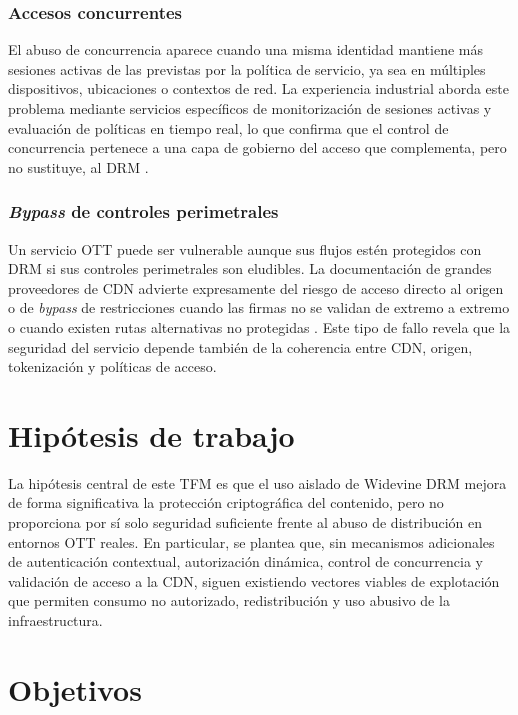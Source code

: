 \subsubsection{Accesos concurrentes}

El abuso de concurrencia aparece cuando una misma identidad mantiene más sesiones activas de las previstas por la política de servicio, ya sea en múltiples dispositivos, ubicaciones o contextos de red. La experiencia industrial aborda este problema mediante servicios específicos de monitorización de sesiones activas y evaluación de políticas en tiempo real, lo que confirma que el control de concurrencia pertenece a una capa de gobierno del acceso que complementa, pero no sustituye, al DRM \cite{adobe2026}.

\subsubsection{\textit{Bypass} de controles perimetrales}

Un servicio OTT puede ser vulnerable aunque sus flujos estén protegidos con DRM si sus controles perimetrales son eludibles. La documentación de grandes proveedores de CDN advierte expresamente del riesgo de acceso directo al origen o de \textit{bypass} de restricciones cuando las firmas no se validan de extremo a extremo o cuando existen rutas alternativas no protegidas \cite{googlemediacdn2026,awscloudfront2026}. Este tipo de fallo revela que la seguridad del servicio depende también de la coherencia entre CDN, origen, tokenización y políticas de acceso.

\section{Hipótesis de trabajo}

La hipótesis central de este TFM es que el uso aislado de Widevine DRM mejora de forma significativa la protección criptográfica del contenido, pero no proporciona por sí solo seguridad suficiente frente al abuso de distribución en entornos OTT reales. En particular, se plantea que, sin mecanismos adicionales de autenticación contextual, autorización dinámica, control de concurrencia y validación de acceso a la CDN, siguen existiendo vectores viables de explotación que permiten consumo no autorizado, redistribución y uso abusivo de la infraestructura.

\section{Objetivos}

